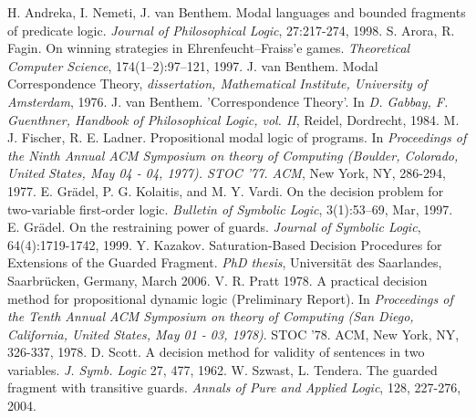 \documentclass[a4paper]{article}
\begin{document}
\begin{thebibliography}{12}
    H. Andreka, I. Nemeti, J. van Benthem. Modal languages and bounded fragments of predicate logic. \emph{Journal of Philosophical Logic}, 27:217-274, 1998. 
    S. Arora, R. Fagin. On winning strategies in Ehrenfeucht--Fraiss'e games. \emph{Theoretical Computer Science}, 174(1--2):97--121, 1997. 
    J. van Benthem. Modal Correspondence Theory, \emph{dissertation, Mathematical Institute, University of Amsterdam}, 1976.
    J. van Benthem. 'Correspondence Theory'. In \emph{D. Gabbay, F. Guenthner, Handbook of Philosophical Logic, vol. II}, Reidel, Dordrecht, 1984.
    M. J. Fischer, R. E. Ladner. Propositional modal logic of programs. In \emph{Proceedings of the Ninth Annual ACM Symposium on theory of Computing (Boulder, Colorado, United States, May 04 - 04, 1977). STOC '77. ACM}, New York, NY, 286-294, 1977.
    E. Gr\"{a}del, P. G. Kolaitis, and M. Y. Vardi. On the decision problem for two-variable first-order logic. \emph{Bulletin of Symbolic Logic}, 3(1):53--69, Mar, 1997.
    E. Gr\"{a}del. On the restraining power of guards. \emph{Journal of Symbolic Logic}, 64(4):1719-1742, 1999.
    Y. Kazakov. Saturation-Based Decision Procedures for Extensions of the Guarded Fragment.
    \emph{PhD thesis}, Universit\"{a}t des Saarlandes, Saarbr\"{u}cken, Germany, March 2006.
    V. R. Pratt 1978. A practical decision method for propositional dynamic logic (Preliminary Report). In \emph{Proceedings of the Tenth Annual ACM Symposium on theory of Computing (San Diego, California, United States, May 01 - 03, 1978)}. STOC '78. ACM, New York, NY, 326-337, 1978.
    D. Scott. A decision method for validity of sentences in two variables. \emph{J. Symb. Logic} 27, 477, 1962.
    W. Szwast, L. Tendera. The guarded fragment with transitive guards. \emph{Annals of Pure and Applied Logic}, 128, 227-276, 2004.
\end{thebibliography}
\end{document}
